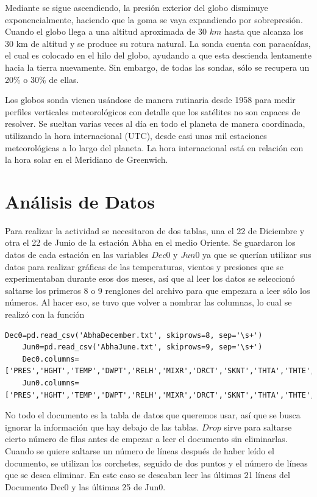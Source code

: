 \documentclass{article}
\begin{document}
    Mediante se sigue ascendiendo, la presión exterior del globo disminuye exponencialmente, haciendo que la goma se vaya expandiendo por sobrepresión. Cuando el globo llega a una altitud aproximada de 30 $km$ hasta que alcanza los 30 km de altitud y se produce su rotura natural. La sonda cuenta con paracaídas, el cual es colocado en el hilo del globo, ayudando a que esta descienda lentamente hacia la tierra nuevamente. Sin embargo, de todas las sondas, sólo se recupera un 20\% o 30\% de ellas.

	Los globos sonda vienen usándose de manera rutinaria desde 1958 para medir perfiles verticales
meteorológicos con detalle que los satélites no son capaces de resolver. Se sueltan varias veces al día en todo el planeta de manera coordinada, utilizando la hora internacional (UTC), desde casi unas mil estaciones meteorológicas a lo largo del planeta. La hora internacional está en relación con la hora solar en el Meridiano de Greenwich.

\section{Análisis de Datos}
Para realizar la actividad se necesitaron de dos tablas, una el 22 de Diciembre y otra el 22 de Junio de la estación Abha en el medio Oriente. Se guardaron los datos de cada estación en las variables $Dec0$ y $Jun0$ ya que se querían utilizar sus datos para realizar gráficas de las temperaturas, vientos y presiones que se experimentaban durante esos dos meses, así que al leer los datos se seleccionó saltarse los primeros 8 o 9 renglones del archivo para que empezara a leer sólo los números. Al hacer eso, se tuvo que volver a nombrar las columnas, lo cual se realizó con la función
	\begin{verbatim}Dec0=pd.read_csv('AbhaDecember.txt', skiprows=8, sep='\s+')
	Jun0=pd.read_csv('AbhaJune.txt', skiprows=9, sep='\s+')
	Dec0.columns=['PRES','HGHT','TEMP','DWPT','RELH','MIXR','DRCT','SKNT','THTA','THTE','THTV']
	Jun0.columns=['PRES','HGHT','TEMP','DWPT','RELH','MIXR','DRCT','SKNT','THTA','THTE','THTV']
    \end{verbatim}

     No todo el documento es la tabla de datos que queremos usar, así que se busca ignorar la información que hay debajo de las tablas. $Drop$ sirve para saltarse cierto número de filas antes de empezar a leer el documento sin eliminarlas. Cuando se quiere saltarse un número de líneas después de haber leído el documento, se utilizan los corchetes, seguido de dos puntos y el número de líneas que se desea eliminar. En este caso se deseaban leer las últimas 21 líneas del Documento Dec0 y las últimas 25 de Jun0.
     
\end{document}
